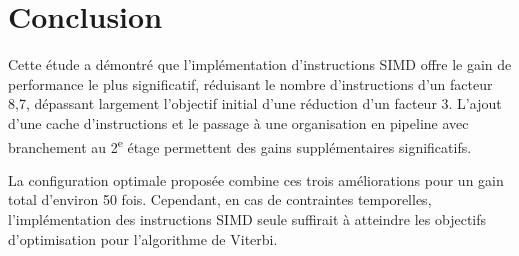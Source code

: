 \documentclass[a11paper]{article}
\begin{document}
\section{Conclusion}

Cette étude a démontré que l'implémentation d'instructions SIMD offre le gain
de performance le plus significatif, réduisant le nombre d'instructions d'un
facteur 8,7, dépassant largement l'objectif initial d'une réduction d'un
facteur 3. L'ajout d'une cache d'instructions et le passage à une
organisation en pipeline avec branchement au 2\textsuperscript{e} étage
permettent des gains supplémentaires
significatifs.

La configuration optimale proposée combine ces trois améliorations pour un
gain total d'environ 50 fois. Cependant, en cas de contraintes temporelles,
l'implémentation des instructions SIMD seule suffirait à atteindre les
objectifs d'optimisation pour l'algorithme de Viterbi.
\end{document}
